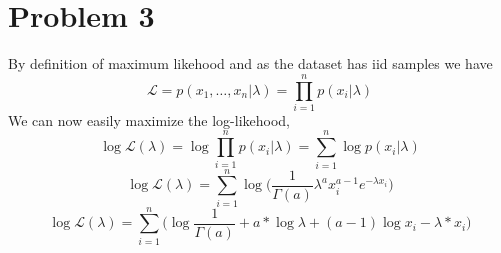 \section{Problem 3}
By definition of maximum likehood and as the dataset has iid samples we have\\
\begin{equation*}
\mathcal{L} = p(x_1,\dots,x_n|\lambda) = \prod_{i=1}^n p(x_i|\lambda)
\end{equation*}
We can now easily maximize the log-likehood, 
\begin{equation*}
\log \mathcal{L}(\lambda) = \log\prod_{i=1}^n p(x_i|\lambda)=\sum_{i=1}^n \log p(x_i|\lambda)
\end{equation*}
\begin{equation*}
\log \mathcal{L}(\lambda) = \sum_{i=1}^n \log \biggl( \frac{1}{\Gamma(a)} \lambda^a x_i^{a-1} e^{-\lambda x_i} \biggr)
\end{equation*}
\begin{equation*}
\log \mathcal{L}(\lambda) = \sum_{i=1}^n \biggl( \log\frac{1}{\Gamma(a)} + a*\log\lambda + (a-1)\log{x_i} - \lambda*x_i \biggr)
\end{equation*}

